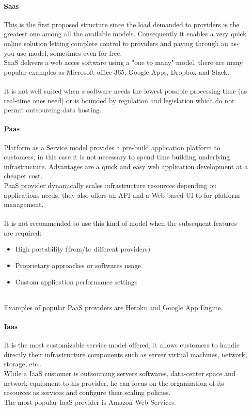 \paragraph{Saas}
\label{paragraph:Saas}
This is the first proposed structure since the load demanded to providers is the greatest one among all the available models.
Consequently it enables a very quick online solution letting complete control to providers and paying through an as-you-use model, sometimes even for free.\\
SaaS delivers a web acces software using a "one to many" model, there are many popular examples as Microsoft office 365, Google Apps, Dropbox and Slack. \cite{saas_examples}\\ \\
It is not well suited when a software needs the lowest possible processing time (as real-time ones need) or is bounded by regulation and legislation which do not permit outsourcing data hosting.
\paragraph{Paas}
\label{paragraph:Paas}
Platform as a Service model provides a pre-build application platform to customers, in this case it is not necessary to spend time building underlying infrastructure. Advantages are a quick and easy web application development at a cheaper cost.\\
PaaS provider dynamically scales infrastructure resources depending on applications needs, they also offers an API and a Web-based UI to for platform management.\\ \\
It is not recommended to use this kind of model when the subsequent features are required:
\begin{itemize}
    \item High portability (from/to different providers)
    \item Proprietary approaches or softwares usage
    \item Custom application performance settings 
\end{itemize}
\cite{CloudComputingModels}\cite{cloud_computing_stack_saas_paas_iaas}\\
Examples of popular PaaS providers are Heroku and Google App Engine.
\paragraph{Iaas}
\label{paragraph:Iaas}
It is the most customizable service model offered, it allows customers to handle directly their infrastructure components such as server virtual machines, network, storage, etc..\\
While a IaaS customer is outsourcing servers softwares, data-center space and network equipment to his provider, he can focus on the organization of its resources as services and configure their scaling policies.\\
The most popular IaaS provider is Amazon Web Services.

